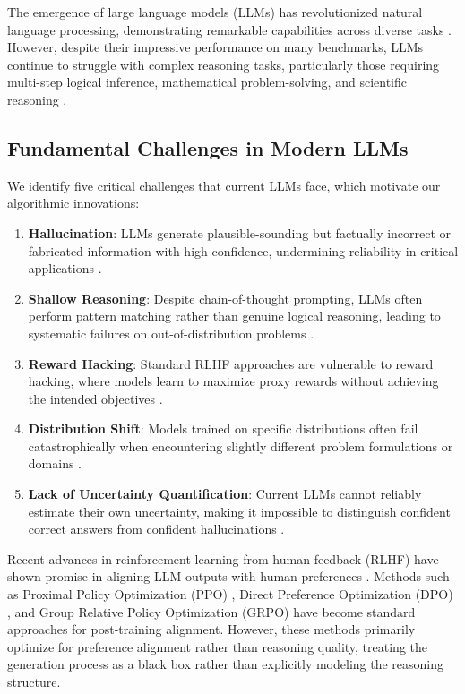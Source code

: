 \documentclass[11pt,a4paper]{article}
\begin{document}
The emergence of large language models (LLMs) has revolutionized natural language processing, demonstrating remarkable capabilities across diverse tasks \citep{brown2020language, touvron2023llama}. However, despite their impressive performance on many benchmarks, LLMs continue to struggle with complex reasoning tasks, particularly those requiring multi-step logical inference, mathematical problem-solving, and scientific reasoning \citep{wei2022chain, kojima2022large}.

\subsection{Fundamental Challenges in Modern LLMs}

We identify five critical challenges that current LLMs face, which motivate our algorithmic innovations:

\begin{enumerate}
    \item \textbf{Hallucination}: LLMs generate plausible-sounding but factually incorrect or fabricated information with high confidence, undermining reliability in critical applications \citep{ji2023survey}.
    
    \item \textbf{Shallow Reasoning}: Despite chain-of-thought prompting, LLMs often perform pattern matching rather than genuine logical reasoning, leading to systematic failures on out-of-distribution problems \citep{dziri2023faith}.
    
    \item \textbf{Reward Hacking}: Standard RLHF approaches are vulnerable to reward hacking, where models learn to maximize proxy rewards without achieving the intended objectives \citep{skalse2022defining}.
    
    \item \textbf{Distribution Shift}: Models trained on specific distributions often fail catastrophically when encountering slightly different problem formulations or domains \citep{yang2023failures}.
    
    \item \textbf{Lack of Uncertainty Quantification}: Current LLMs cannot reliably estimate their own uncertainty, making it impossible to distinguish confident correct answers from confident hallucinations \citep{kadavath2022language}.
\end{enumerate}

Recent advances in reinforcement learning from human feedback (RLHF) have shown promise in aligning LLM outputs with human preferences \citep{ouyang2022training, bai2022training}. Methods such as Proximal Policy Optimization (PPO) \citep{schulman2017proximal}, Direct Preference Optimization (DPO) \citep{rafailov2023direct}, and Group Relative Policy Optimization (GRPO) \citep{shao2024deepseekmath} have become standard approaches for post-training alignment. However, these methods primarily optimize for preference alignment rather than reasoning quality, treating the generation process as a black box rather than explicitly modeling the reasoning structure.
\end{document}
